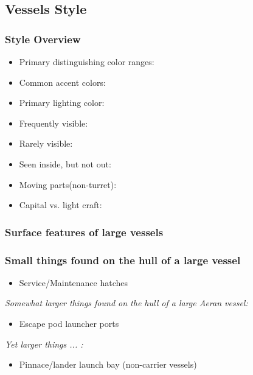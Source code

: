 

\subsection{Vessels Style}

\subsubsection{Style Overview}
\begin{itemize}

\item Primary distinguishing color ranges: 

\item Common accent colors:

\item Primary lighting color:

\item Frequently visible: 

\item Rarely visible:

\item Seen inside, but not out: 

\item Moving parts(non-turret): 

\item Capital vs. light craft: 

\end{itemize}

\subsubsection{Surface features of large vessels}

\subsubsection{Small things found on the hull of a large  vessel}
\begin{itemize}
\item Service/Maintenance hatches
\end{itemize}
{\it Somewhat larger things found on the hull of a large Aeran vessel:}
\begin{itemize}
\item Escape pod launcher ports
\end{itemize}
{\it Yet larger things ... :}
\begin{itemize}
\item Pinnace/lander launch bay (non-carrier vessels)
\end{itemize}

